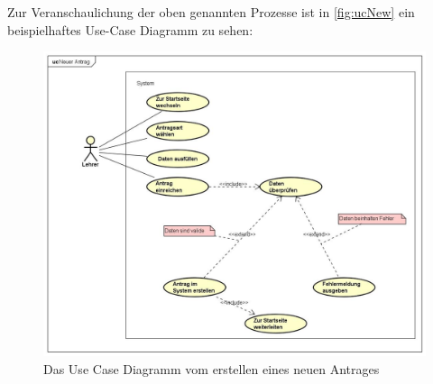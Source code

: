 Zur Veranschaulichung der oben genannten Prozesse ist in \autoref{fig:ucNew} ein beispielhaftes Use-Case Diagramm zu sehen: 
\begin{figure}[H]
	\centering
	\includegraphics[width=1\linewidth]{images/ldehner_konzept/uc-new}
	\caption[Use Case Diagramm Neuer Antrag]{Das Use Case Diagramm vom erstellen eines neuen Antrages}
	\label{fig:ucNew}
\end{figure}
\newpage
